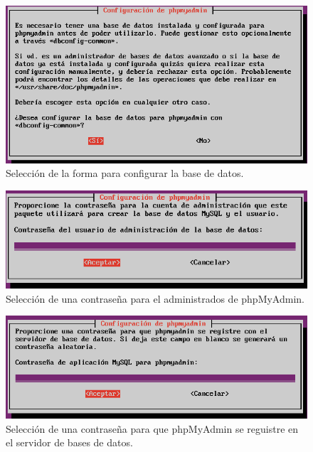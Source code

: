 \begin{figure}[H]
    \begin{center}
        \includegraphics[scale=0.5]{imagenes/img31}
        \caption{Selección de la forma para configurar la base de datos.}
        \label{fig28}
    \end{center}
\end{figure}

\begin{figure}[H]
    \begin{center}
        \includegraphics[scale=0.5]{imagenes/img32}
        \caption{Selección de una contraseña para el administrados de phpMyAdmin.}
        \label{fig29}
    \end{center}
\end{figure}

\begin{figure}[H]
    \begin{center}
        \includegraphics[scale=0.5]{imagenes/img33}
        \caption{Selección de una contraseña para que phpMyAdmin se reguistre en el servidor de bases de datos.}
        \label{fig30}
    \end{center}
\end{figure}

